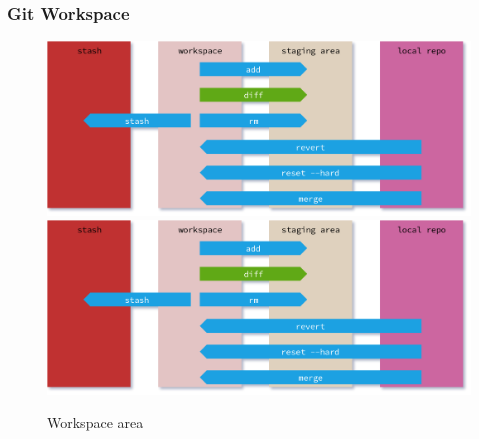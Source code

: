 \begin{frame}
    \frametitle{Git Workspace}
    \addtocounter{page}{-1}
    \begin{figure}
        \begin{center}
            {
                \includegraphics[width=1\textwidth,keepaspectratio]{./images/GitAreas-Workspace.png}
            }
            {
                \includegraphics[height=0.75\textheight,keepaspectratio]{./images/GitAreas-Workspace.png}
            }
            \caption{Workspace area}
        \end{center}
    \end{figure}
\end{frame}

